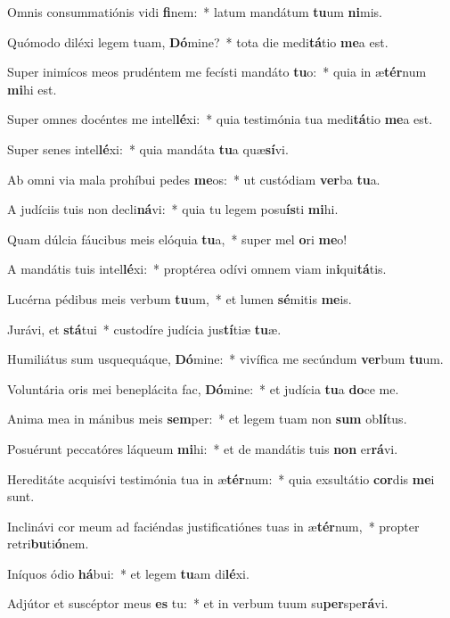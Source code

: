 \item Omnis consummatiónis vidi \textbf{fi}nem:~* latum mandátum \textbf{tu}um \textbf{ni}mis.
\item Quómodo diléxi legem tuam, \textbf{Dó}mine?~* tota die medi\textbf{tá}tio \textbf{me}a est.
\item Super inimícos meos prudéntem me fecísti mandáto \textbf{tu}o:~* quia in æ\textbf{tér}num \textbf{mi}hi est.
\item Super omnes docéntes me intel\textbf{lé}xi:~* quia testimónia tua medi\textbf{tá}tio \textbf{me}a est.
\item Super senes intel\textbf{lé}xi:~* quia mandáta \textbf{tu}a quæ\textbf{sí}vi.
\item Ab omni via mala prohíbui pedes \textbf{me}os:~* ut custódiam \textbf{ver}ba \textbf{tu}a.
\item A judíciis tuis non decli\textbf{ná}vi:~* quia tu legem posu\textbf{ís}ti \textbf{mi}hi.
\item Quam dúlcia fáucibus meis elóquia \textbf{tu}a,~* super mel \textbf{o}ri \textbf{me}o!
\item A mandátis tuis intel\textbf{lé}xi:~* proptérea odívi omnem viam in\textbf{i}qui\textbf{tá}tis.
\item Lucérna pédibus meis verbum \textbf{tu}um,~* et lumen \textbf{sé}mitis \textbf{me}is.
\item Jurávi, et \textbf{stá}tui~* custodíre judícia jus\textbf{tí}tiæ \textbf{tu}æ.
\item Humiliátus sum usquequáque, \textbf{Dó}mine:~* vivífica me secúndum \textbf{ver}bum \textbf{tu}um.
\item Voluntária oris mei beneplácita fac, \textbf{Dó}mine:~* et judícia \textbf{tu}a \textbf{do}ce me.
\item Anima mea in mánibus meis \textbf{sem}per:~* et legem tuam non \textbf{sum} ob\textbf{lí}tus.
\item Posuérunt peccatóres láqueum \textbf{mi}hi:~* et de mandátis tuis \textbf{non} er\textbf{rá}vi.
\item Hereditáte acquisívi testimónia tua in æ\textbf{tér}num:~* quia exsultátio \textbf{cor}dis \textbf{me}i sunt.
\item Inclinávi cor meum ad faciéndas justificatiónes tuas in æ\textbf{tér}num,~* propter retri\textbf{bu}ti\textbf{ó}nem.
\item Iníquos ódio \textbf{há}bui:~* et legem \textbf{tu}am di\textbf{lé}xi.
\item Adjútor et suscéptor meus \textbf{es} tu:~* et in verbum tuum su\textbf{per}spe\textbf{rá}vi.
